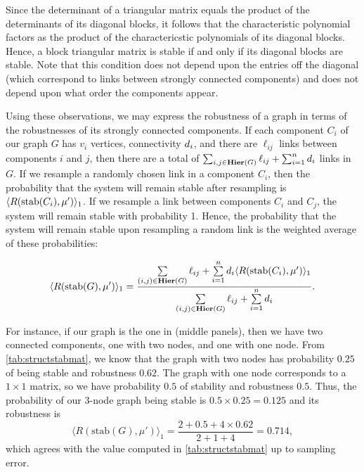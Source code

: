 Since the determinant of a triangular matrix equals the product of the determinants of its diagonal blocks, it follows that the characteristic polynomial factors as the product of the charactericstic polynomials of its diagonal blocks.  Hence, a block triangular matrix is stable if and only if its diagonal blocks are stable.  Note that this condition does not depend upon the entries off the diagonal (which correspond to links between strongly connected components) and does not depend upon what order the components appear.

Using these observations, we may express the robustness of a graph in
terms of the robustnesses of its strongly connected components.  If
each component $C_i$ of our graph $G$ has $v_i$ vertices, connectivity
$d_i$, and there are $\ell_{ij}$ links between components
$i$ and $j$, then there are a total of
$\sum_{i,j \in \mathbf{Hier}(G)} \ell_{ij} + \sum_{i=1}^n d_i$
links in $G$.  If we resample a randomly chosen link in a component
$C_i$, then the probability that the system will remain stable after
resampling is $\langle R(\hbox{stab} (C_i), \mu') \rangle_1$.  If we resample a link
between components $C_i$ and $C_j$, the system will remain stable with
probability 1.  Hence, the probability that the system will remain
stable upon resampling a random link is the weighted average of these
probabilities:
\begin{widetext}
\begin{align}\label{eq:sccrobustness}
\langle R(\hbox{stab} (G), \mu') \rangle_1 =
\frac{\sum\limits_{(i,j) \in \mathbf{Hier}(G)} \ell_{ij} +
      \sum\limits_{i=1}^n d_i \langle R(\textrm{stab}(C_i),\mu') \rangle_1}
     {\sum\limits_{(i,j) \in \mathbf{Hier}(G)} \ell_{ij} +
      \sum\limits_{i=1}^n d_i}.
\end{align}
\end{widetext}
For instance, if our graph is the one in  (middle panels), then we have two connected components, one with two nodes, and one with one node.  From \ref{tab:structstabmat}, we know that the graph with two nodes has probability $0.25$ of being stable and robustness $0.62$.  The graph with one node corresponds to a $1 \times 1$ matrix, so we have probability $0.5$ of stability and robustness $0.5$.  Thus, the probability of our 3-node graph being stable is $0.5 \times 0.25 = 0.125$ and its robustness is
\[
\langle R(\textrm{stab}(G),\mu') \rangle_1 = \frac{2 + 0.5 + 4 \times 0.62}{2 + 1 + 4} = 0.714,
\]
which agrees with the value computed in \ref{tab:structstabmat} up to
sampling error.


